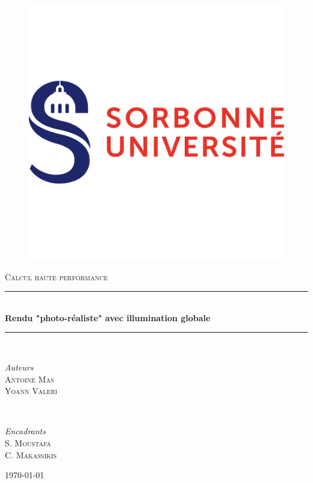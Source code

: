 \documentclass{article}
\begin{document}
\begin{titlepage}

  \newcommand{\HRule}{\rule{\linewidth}{0.5mm}}

  \center

  \begin{figure}
    \centering
    \includegraphics[scale=0.75]{logo.png}
  \end{figure} 
  
  \textsc{\Large Calcul haute performance} \\[0.5cm]

  \HRule\\[0.5cm]

  {\huge\bfseries Rendu "photo-r\'ealiste" avec illumination globale}\\[0.3cm]

  \HRule\\[2.4cm]

  \begin{minipage}{0.4\textwidth}
		\begin{flushleft}
			\large
      \textit{Auteurs}\\[0.3cm]
      \textsc{Antoine Mas} \\[0.1cm]
      \textsc{Yoann Valeri} \\[0.1cm]
		\end{flushleft}
	\end{minipage}
  ~
  \begin{minipage}{0.4\textwidth}
		\begin{flushright}
			\large
      \textit{Encadrants}\\[0.3cm]
      \textsc{S. Moustafa} \\[0.1cm]
      \textsc{C. Makassikis} \\[0.1cm]
		\end{flushright}
	\end{minipage}

  \vspace*{\fill}
  \textsc{\today}

\end{titlepage}
\end{document}

